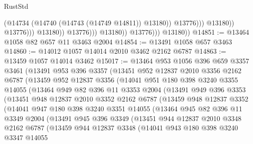 \begin{lexlean}{RustStd}
\begin{coremodule}
{\begin{coremodule}
{{{{{{{{{{{{{{{{{{{{{{{{{{{{{{{                                            (@14734 (@14740 (@14743 (@14749 @14811)) @13180))
                                            @13776)))
                                      @13180))
                                  @13776)))
                            @13180))
                        @13776)))
                  @13180))
              @13776)))
        @13180))
@14851 := @13464 @1058 @82 @657 @11 @3463 @2004
@14854 := @13491 @1058 @657 @3463
@14860 := @14012 @1057 @14014 @2010 @3462 @2162 @6787
@14863 := @13459 @1057 @14014 @3462
@15017 := @13464
    @953
    @1056
    @396
    @659
    @3357
    @3461
    (@13491
      @953
      @396
      @3357
      (@13451
        @952
        @12837
        @2010
        @3356
        @2162
        @6787
        (@13459
          @952
          @12837
          @3356
          (@14041
            @951
            @180
            @398
            @3240
            @3355
            @14055
            (@13464
              @949
              @82
              @396
              @11
              @3353
              @2004
              (@13491
                @949
                @396
                @3353
                (@13451
                  @948
                  @12837
                  @2010
                  @3352
                  @2162
                  @6787
                  (@13459
                    @948
                    @12837
                    @3352
                    (@14041
                      @947
                      @180
                      @398
                      @3240
                      @3351
                      @14055
                      (@13464
                        @945
                        @82
                        @396
                        @11
                        @3349
                        @2004
                        (@13491
                          @945
                          @396
                          @3349
                          (@13451
                            @944
                            @12837
                            @2010
                            @3348
                            @2162
                            @6787
                            (@13459
                              @944
                              @12837
                              @3348
                              (@14041
                                @943
                                @180
                                @398
                                @3240
                                @3347
                                @14055
}}}}}}}}}}}}}}}}}}}}}}}}}}}}}}}
\end{coremodule}}
\end{coremodule}
\end{lexlean}
